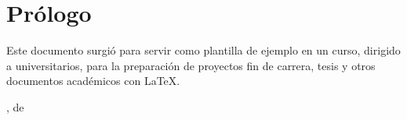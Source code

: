 \chapter{Prólogo}

Este documento surgió para servir como plantilla de ejemplo en un curso, dirigido a universitarios, para la preparación de proyectos fin de carrera, tesis y otros documentos académicos con \LaTeX{}.

\begin{flushright}
	\makeatletter
	\@lugarDef, \@mesDef{} de \@yearDef\\[1cm]
	\@autor{}\\
	\@email
	\makeatother
\end{flushright}